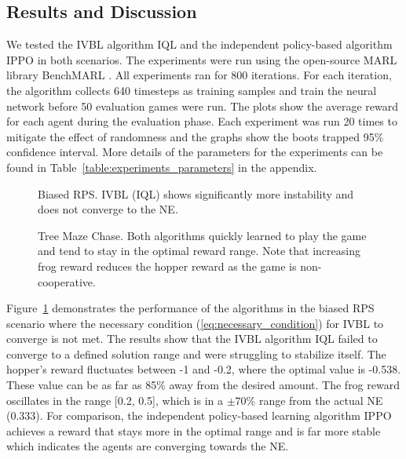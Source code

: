 \documentclass[]{interact}
\theoremstyle{plain}%
\theoremstyle{definition}
\theoremstyle{remark}
\begin{document}
\subsection{Results and Discussion}
We tested the IVBL algorithm IQL and the independent policy-based algorithm IPPO in both scenarios. The experiments were run using the open-source MARL library BenchMARL \cite{bettini2024benchmarl}. All experiments ran for 800 iterations. For each iteration, the algorithm collects 640 timesteps as training samples and train the neural network before 50 evaluation games were run. The plots show the average reward for each agent during the evaluation phase. Each experiment was run 20 times to mitigate the effect of randomness and the graphs show the boots trapped 95\% confidence interval. More details of the parameters for the experiments can be found in Table~\ref{table:experiments_parameters} in the appendix.

\begin{figure}
\centering
{}
\caption{Biased RPS. IVBL (IQL) shows significantly more instability and does not converge to the NE.}
\label{fig:biased_rps_in_food_chain_rewards}
\end{figure}

\begin{figure}
\centering
{}
\caption{Tree Maze Chase. Both algorithms quickly learned to play the game and tend to stay in the optimal reward range. Note that increasing frog reward reduces the hopper reward as the game is non-cooperative.}
\label{fig:tree_maze_chase_rewards}
\end{figure}

Figure~\ref{fig:biased_rps_in_food_chain_rewards} demonstrates the performance of the algorithms in the biased RPS scenario where the necessary condition (\ref{eq:necessary_condition}) for IVBL to converge is not met. The results show that the IVBL algorithm IQL failed to converge to a defined solution range and were struggling to stabilize itself. The hopper's reward fluctuates between -1 and -0.2, where the optimal value is -0.538. These value can be as far as 85\% away from the desired amount. The frog reward oscillates in the range [0.2, 0.5], which is in a $\pm 70\%$  range from the actual NE (0.333). For comparison, the independent policy-based learning algorithm IPPO achieves a reward that stays more in the optimal range and is far more stable which indicates the agents are converging towards the NE.
\end{document}
